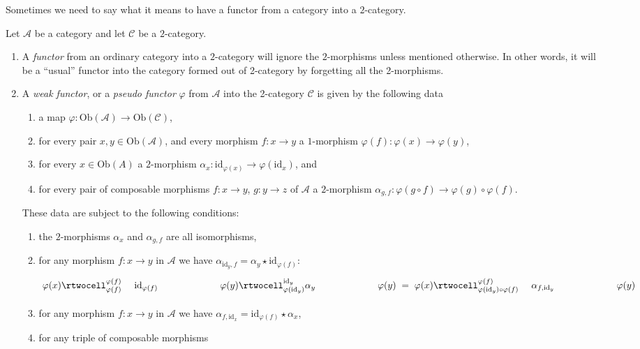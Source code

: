 \noindent
Sometimes we need to say what it means to have a functor from a
category into a $2$-category.

\begin{definition}
\label{definition-functor-into-2-category}
Let $\mathcal{A}$ be a category and let $\mathcal{C}$ be a $2$-category.
\begin{enumerate}
\item A {\it functor} from an ordinary category into a $2$-category
will ignore the
$2$-morphisms unless mentioned otherwise. In other words, it will be a
``usual'' functor into the category formed out of 2-category by forgetting
all the 2-morphisms.
\item A {\it weak functor}, or
a {\it pseudo functor} $\varphi$ from $\mathcal{A}$ into the 2-category
$\mathcal{C}$ is given by the following data
\begin{enumerate}
\item a map $\varphi : \text{Ob}(\mathcal{A}) \to \text{Ob}(\mathcal{C})$,
\item for every pair $x, y\in \text{Ob}(\mathcal{A})$, and every
morphism $f : x \to y$ a $1$-morphism $\varphi(f) : \varphi(x) \to \varphi(y)$,
\item for every $x\in \text{Ob}(A)$ a $2$-morphism
$\alpha_x : \text{id}_{\varphi(x)} \to \varphi(\text{id}_{x})$, and
\item for every pair of composable morphisms $f : x \to y$,
$g : y \to z$ of $\mathcal{A}$ a $2$-morphism
$\alpha_{g, f} : \varphi(g \circ f) \to \varphi(g) \circ \varphi(f)$.
\end{enumerate}
These data are subject to the following conditions:
\begin{enumerate}
\item the $2$-morphisms $\alpha_x$ and $\alpha_{g, f}$ are all
isomorphisms,
\item for any morphism $f : x \to y$ in $\mathcal{A}$ we have
$\alpha_{\text{id}_y, f} = \alpha_y \star \text{id}_{\varphi(f)}$:
$$
\xymatrixcolsep{5pc}
\xymatrix{
\varphi(x)
\rtwocell^{\varphi(f)}_{\varphi(f)}{\ \ \ \ \text{id}_{\varphi(f)}}
&
\varphi(y)
\rtwocell^{\text{id}_y}_{\varphi(\text{id}_y)}{\alpha_y}
&
\varphi(y)
}
=
\xymatrix{
\varphi(x)
\rtwocell^{\varphi(f)}_{\varphi(\text{id}_y) \circ \varphi(f)}%
{\ \ \ \ \alpha_{f, \text{id}_y}}
&
\varphi(y)
}
$$
\item for any morphism $f : x \to y$ in $\mathcal{A}$ we have
$\alpha_{f, \text{id}_x} = \text{id}_{\varphi(f)} \star \alpha_x$,
\item for any triple of composable morphisms

\end{enumerate}
\end{enumerate}
\end{definition}
